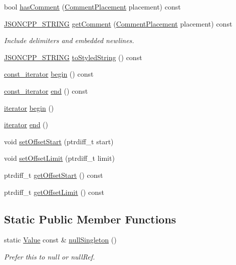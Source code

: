 \begin{DoxyCompactItemize}
bool \hyperlink{class_json_1_1_value_a65d8e3ab6a5871cbd019a3e0f0b944a3}{has\+Comment} (\hyperlink{namespace_json_a4fc417c23905b2ae9e2c47d197a45351}{Comment\+Placement} placement) const
\item 
\hyperlink{json_8h_a1e723f95759de062585bc4a8fd3fa4be}{J\+S\+O\+N\+C\+P\+P\+\_\+\+S\+T\+R\+I\+NG} \hyperlink{class_json_1_1_value_a82817229a986f0b254e31d5c83066ffe}{get\+Comment} (\hyperlink{namespace_json_a4fc417c23905b2ae9e2c47d197a45351}{Comment\+Placement} placement) const
\begin{DoxyCompactList}\small\item\em Include delimiters and embedded newlines. \end{DoxyCompactList}\item 
\hyperlink{json_8h_a1e723f95759de062585bc4a8fd3fa4be}{J\+S\+O\+N\+C\+P\+P\+\_\+\+S\+T\+R\+I\+NG} \hyperlink{class_json_1_1_value_a00154cc8662d7a845ed59e175c2496cb}{to\+Styled\+String} () const
\item 
\hyperlink{class_json_1_1_value_af92282ca92b58b320debd486afb7696a}{const\+\_\+iterator} \hyperlink{class_json_1_1_value_a015459a3950c198d63a2d3be8f5ae296}{begin} () const
\item 
\hyperlink{class_json_1_1_value_af92282ca92b58b320debd486afb7696a}{const\+\_\+iterator} \hyperlink{class_json_1_1_value_a3e443cd0ef24f7e028b175e47ee045e0}{end} () const
\item 
\hyperlink{class_json_1_1_value_a341cdf2e01f8b3c5b7317aa2f0768c53}{iterator} \hyperlink{class_json_1_1_value_a2d45bb2e68e8f22fe356d7d955ebd3c9}{begin} ()
\item 
\hyperlink{class_json_1_1_value_a341cdf2e01f8b3c5b7317aa2f0768c53}{iterator} \hyperlink{class_json_1_1_value_a2f961eff73f7f79cd29260b6cbd42558}{end} ()
\item 
void \hyperlink{class_json_1_1_value_a92e32ea0f4f8a15853a3cf0beac9feb9}{set\+Offset\+Start} (ptrdiff\+\_\+t start)
\item 
void \hyperlink{class_json_1_1_value_a5e4f5853fec138150c5df6004a8c2bcf}{set\+Offset\+Limit} (ptrdiff\+\_\+t limit)
\item 
ptrdiff\+\_\+t \hyperlink{class_json_1_1_value_afa081dc764000951a1d8d6148155508e}{get\+Offset\+Start} () const
\item 
ptrdiff\+\_\+t \hyperlink{class_json_1_1_value_a2cdfa01935f87fcace90d450cbd2c0a4}{get\+Offset\+Limit} () const
\end{DoxyCompactItemize}
\subsection*{Static Public Member Functions}
\begin{DoxyCompactItemize}
\item 
static \hyperlink{class_json_1_1_value}{Value} const  \& \hyperlink{class_json_1_1_value_af2f124567acc35d021a424e53ebdfcab}{null\+Singleton} ()
\begin{DoxyCompactList}\small\item\em Prefer this to null or null\+Ref. \end{DoxyCompactList}\end{DoxyCompactItemize}
